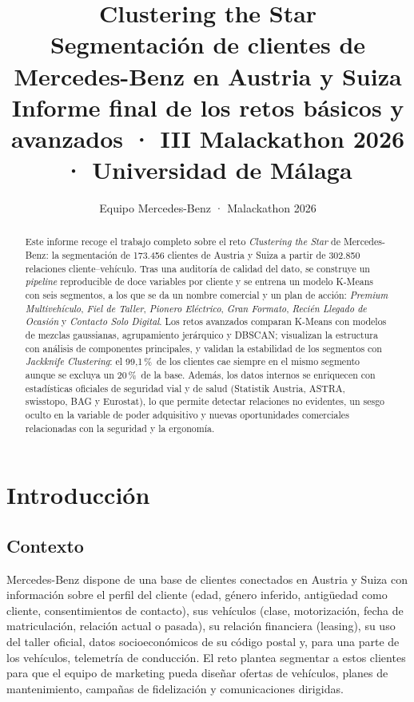 \documentclass[11pt,a4paper]{article}
\title{\textbf{Clustering the Star}\\[4pt]
\large Segmentación de clientes de Mercedes-Benz en Austria y Suiza\\[2pt]
\normalsize Informe final de los retos básicos y avanzados · III Malackathon 2026 · Universidad de Málaga}
\author{Equipo Mercedes-Benz · Malackathon 2026}
\date{}
\newcommand{\pct}{\,\%}
\newcommand{\seg}[1]{\textit{#1}}
\begin{document}
\maketitle

\begin{abstract}
\noindent Este informe recoge el trabajo completo sobre el reto \emph{Clustering the Star} de Mercedes-Benz: la
segmentación de 173.456 clientes de Austria y Suiza a partir de 302.850 relaciones cliente--vehículo. Tras una auditoría
de calidad del dato, se construye un \emph{pipeline} reproducible de doce variables por cliente y se entrena un modelo
K-Means con seis segmentos, a los que se da un nombre comercial y un plan de acción: \seg{Premium Multivehículo},
\seg{Fiel de Taller}, \seg{Pionero Eléctrico}, \seg{Gran Formato}, \seg{Recién Llegado de Ocasión} y
\seg{Contacto Solo Digital}. Los retos avanzados comparan K-Means con modelos de mezclas gaussianas, agrupamiento
jerárquico y DBSCAN; visualizan la estructura con análisis de componentes principales, y validan la estabilidad de los
segmentos con \emph{Jackknife Clustering}: el 99,1\pct\ de los clientes cae siempre en el mismo segmento aunque se
excluya un 20\pct\ de la base. Además, los datos internos se enriquecen con estadísticas oficiales de seguridad vial y
de salud (Statistik Austria, ASTRA, swisstopo, BAG y Eurostat), lo que permite detectar relaciones no evidentes, un
sesgo oculto en la variable de poder adquisitivo y nuevas oportunidades comerciales relacionadas con la seguridad y la
ergonomía.
\end{abstract}

\tableofcontents
\newpage

\section{Introducción}

\subsection{Contexto}

Mercedes-Benz dispone de una base de clientes conectados en Austria y Suiza con información sobre el perfil del
cliente (edad, género inferido, antigüedad como cliente, consentimientos de contacto), sus vehículos (clase, motorización,
fecha de matriculación, relación actual o pasada), su relación financiera (leasing), su uso del taller oficial, datos
socioeconómicos de su código postal y, para una parte de los vehículos, telemetría de conducción. El reto plantea
segmentar a estos clientes para que el equipo de marketing pueda diseñar ofertas de vehículos, planes de mantenimiento,
campañas de fidelización y comunicaciones dirigidas.
\end{document}
